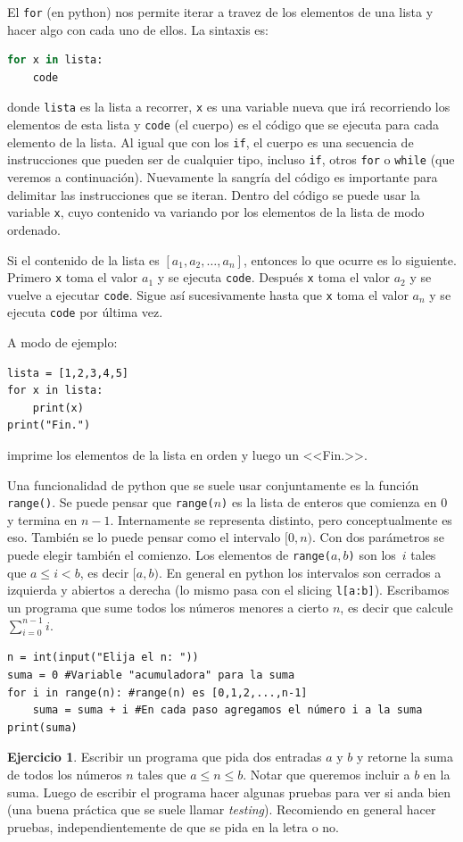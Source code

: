 \documentclass[a4paper, 12pt]{report}
\theoremstyle{definition}
\newtheorem{ejercicio}{Ejercicio}[section]
\begin{document}
El {\tt for} (en python) nos permite iterar a travez de los elementos de una lista y hacer algo con cada uno de ellos. La sintaxis es:
\begin{lstlisting}[language=python]
for x in lista:
    code
\end{lstlisting}
donde {\tt lista} es la lista a recorrer, {\tt x} es una variable nueva que irá recorriendo los elementos de esta lista y {\tt code} (el cuerpo) es el código que se ejecuta para cada elemento de la lista. Al igual que con los {\tt if}, el cuerpo es una secuencia de instrucciones que pueden ser de cualquier tipo, incluso {\tt if}, otros {\tt for} o {\tt while} (que veremos a continuación). Nuevamente la sangría del código es importante para delimitar las instrucciones que se iteran. Dentro del código se puede usar la variable {\tt x}, cuyo contenido va variando por los elementos de la lista de modo ordenado.

Si el contenido de la lista es $[a_1,a_2,\dots,a_n]$, entonces lo que ocurre es lo siguiente. Primero {\tt x} toma el valor $a_1$ y se ejecuta {\tt code}. Después {\tt x} toma el valor $a_2$ y se vuelve a ejecutar {\tt code}. Sigue así sucesivamente hasta que {\tt x} toma el valor $a_n$ y se ejecuta {\tt code} por última vez.

A modo de ejemplo:
\begin{verbatim}
lista = [1,2,3,4,5]
for x in lista:
    print(x)
print("Fin.")
\end{verbatim}
imprime los elementos de la lista en orden y luego un <<Fin.>>.

Una funcionalidad de python que se suele usar conjuntamente es la función {\tt range()}. Se puede pensar que {\tt range($n$)} es la lista de enteros que comienza en $0$ y termina en $n-1$. Internamente se representa distinto, pero conceptualmente es eso. También se lo puede pensar como el intervalo $[0,n)$. Con dos parámetros se puede elegir también el comienzo. Los elementos de {\tt range($a,b$)} son los~$i$ tales que $a\leq i<b$, es decir $[a,b)$. En general en python los intervalos son cerrados a izquierda y abiertos a derecha (lo mismo pasa con el slicing {\tt l[a:b]}). Escribamos un programa que sume todos los números menores a cierto $n$, es decir que calcule $\sum_{i=0}^{n-1}i$.
\begin{verbatim}
n = int(input("Elija el n: "))
suma = 0 #Variable "acumuladora" para la suma
for i in range(n): #range(n) es [0,1,2,...,n-1]
    suma = suma + i #En cada paso agregamos el número i a la suma
print(suma)
\end{verbatim}
\begin{ejercicio}
	Escribir un programa que pida dos entradas $a$ y $b$ y retorne la suma de todos los números $n$ tales que $a\leq n\leq b$. Notar que queremos incluir a $b$ en la suma. Luego de escribir el programa hacer algunas pruebas para ver si anda bien (una buena práctica que se suele llamar {\sl testing}). Recomiendo en general hacer pruebas, independientemente de que se pida en la letra o no.
\end{ejercicio}
\end{document}
